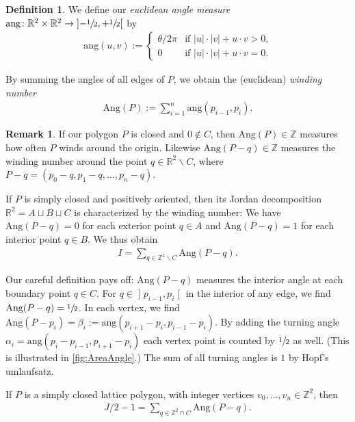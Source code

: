 \documentclass[a4paper]{amsart}
\numberwithin{equation}{section}
\theoremstyle{plain}
\theoremstyle{definition}
\newtheorem{definition}[theorem]{Definition}
\newtheorem{remark}[theorem]{Remark}
\newcommand{\Z}{\mathbb{Z}}
\newcommand{\R}{\mathbb{R}}
\newcommand{\ee}[2]{\mathopen] #1, #2 \mathclose[}
\newcommand{\minus}{\smallsetminus}
\newcommand{\abs}[1]{\lvert #1 \rvert}
\newcommand{\ang}{\mathrm{ang}}
\newcommand{\Ang}{\mathrm{Ang}}
\begin{document}
\begin{definition}
  We define our \emph{euclidean angle measure}
  $\ang \colon \R^2 \times \R^2 \to \ee{-\sfrac{1}{2}}{+\sfrac{1}{2}}$ by
  \begin{align}
    \ang(u,v) := \begin{cases}
      \theta / 2\pi & \text{if $\abs{u} \cdot \abs{v} + u \cdot v > 0$,}
      \\ 0 & \text{if $\abs{u} \cdot \abs{v} + u \cdot v = 0$.}
    \end{cases}
  \end{align}
  
  By summing the angles of all edges of $P$,
  we obtain the (euclidean) \emph{winding number} %
  \begin{align}
    \Ang(P) := \sum_{i=1}^n \ang(p_{i-1},p_i) .
  \end{align}
\end{definition}

\begin{remark}
  If our polygon $P$ is closed and $0 \notin C$, then $\Ang(P) \in \Z$
  measures how often $P$ winds around the origin.
  Likewise $\Ang(P-q) \in \Z$ measures the winding number
  around the point $q \in \R^2 \minus C$,
  where $P-q = (p_0-q,p_1-q,\ldots,p_n-q)$.

  If $P$ is simply closed and positively oriented,
  then its Jordan decomposition $\R^2 = A \sqcup B \sqcup C$
  is characterized by the winding number:
  We have $\Ang(P-q) = 0$ for each exterior point $q \in A$
  and $\Ang(P-q) = 1$ for each interior point $q \in B$.
  We thus obtain
  \begin{align}
    I = \sum_{q \in \Z^2 \minus C} \Ang(P-q) .
  \end{align}
  
  Our careful definition pays off: %
  $\Ang(P-q)$ measures the interior angle at each boundary point $q \in C$.
  For $q \in \ee{p_{i-1}}{p_i}$ in the interior of any edge,
  we find $\Ang(P-q) = \sfrac{1}{2}$.  In each vertex, we find
  $\Ang(P-p_i) = \beta_i := \ang(p_{i+1}-p_i, p_{i-1}-p_i)$.
  By adding the turning angle $\alpha_i = \ang(p_i-p_{i-1}, p_{i+1}-p_i)$
  each vertex point is counted by $\sfrac{1}{2}$ as well.
  (This is illustrated in \autoref{fig:AreaAngle}.)
  The sum of all turning angles is $1$ by Hopf's umlaufsatz.

  If $P$ is a simply closed lattice polygon,
  with integer vertices $v_0,\ldots,v_n \in \Z^2$, then
  \begin{align}
    J/2 - 1 = \sum_{q \in \Z^2 \cap C} \Ang(P-q) .
  \end{align}
\end{remark}
\end{document}
